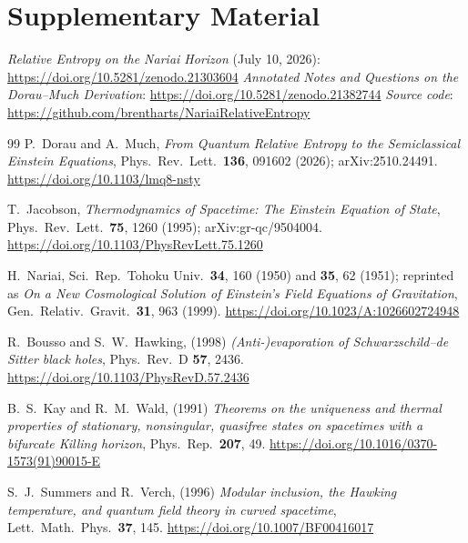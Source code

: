\documentclass[11pt]{article}
\begin{document}
\appendix

\section{Supplementary Material}
\noindent \emph{Relative Entropy on the Nariai Horizon} (July 10, 2026): 
\newline \url{https://doi.org/10.5281/zenodo.21303604}
\newline
\emph{Annotated Notes and Questions on the Dorau--Much Derivation}: 
\newline
\url{https://doi.org/10.5281/zenodo.21382744}
\newline
\emph{Source code}: \url{https://github.com/brentharts/NariaiRelativeEntropy}




\begingroup
\footnotesize
\begin{thebibliography}{99}\setlength{\itemsep}{1pt}\setlength{\parskip}{0pt}
 P.~Dorau and A.~Much, \emph{From Quantum Relative Entropy to the Semiclassical Einstein Equations}, Phys.\ Rev.\ Lett.\ \textbf{136}, 091602 (2026); arXiv:2510.24491.
\url{https://doi.org/10.1103/lmq8-nsty}

 T.~Jacobson, \emph{Thermodynamics of Spacetime: The Einstein Equation of State}, Phys.\ Rev.\ Lett.\ \textbf{75}, 1260 (1995); arXiv:gr-qc/9504004. \url{https://doi.org/10.1103/PhysRevLett.75.1260}

 H.~Nariai, Sci.\ Rep.\ Tohoku Univ.\ \textbf{34}, 160 (1950) and \textbf{35}, 62 (1951); reprinted as \emph{On a New Cosmological Solution of Einstein's Field Equations of Gravitation}, Gen.\ Relativ.\ Gravit.\ \textbf{31}, 963 (1999). \url{https://doi.org/10.1023/A:1026602724948}

 R.~Bousso and S.~W.~Hawking, (1998) \emph{(Anti-)evaporation of Schwarzschild--de Sitter black holes}, Phys.\ Rev.\ D \textbf{57}, 2436.
\url{https://doi.org/10.1103/PhysRevD.57.2436}

 B.~S.~Kay and R.~M.~Wald, (1991) \emph{Theorems on the uniqueness and thermal properties of stationary, nonsingular, quasifree states on spacetimes with a bifurcate Killing horizon}, Phys.\ Rep.\ \textbf{207}, 49.
\url{https://doi.org/10.1016/0370-1573(91)90015-E}

 S.~J.~Summers and R.~Verch, (1996) \emph{Modular inclusion, the Hawking temperature, and quantum field theory in curved spacetime}, Lett.\ Math.\ Phys.\ \textbf{37}, 145.
\url{https://doi.org/10.1007/BF00416017}


\end{thebibliography}
\end{document}
